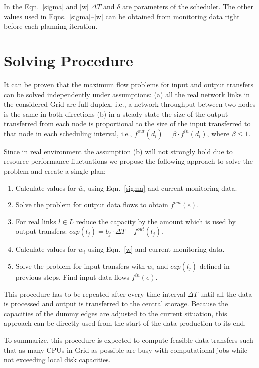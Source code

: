 \documentclass{svjour3}                     %
\begin{document}
%

In the Eqn.~\ref{sigma} and \ref{w} $\Delta T$ and $\delta$ are parameters of the scheduler. The other values used in
Eqns.~\ref{sigma}--\ref{w} can be obtained from monitoring data right before each planning iteration.

\section{Solving Procedure}
\label{solve}
It can be proven that the maximum flow problems for input and output transfers
can be solved independently under assumptions: (a) all the real network links
in the considered Grid are full-duplex, i.e., a network throughput between two
nodes is the same in both directions (b) in a steady state the size of the
output transferred from each node is proportional to the size of the input
transferred to that node in each scheduling interval, i.e.,
$f^{out}(\overline{d}_{i})= \beta \cdot f^{in}(d_{i})$, where $\beta \leq 1$.

Since in real environment the assumption (b) will not strongly hold due to
resource performance fluctuations we propose the following approach to
solve the problem and create a single plan:
%
\begin{enumerate}
\item Calculate values for $\overline{w}_{i}$ using Eqn.~\ref{sigma} and current monitoring data.
\item Solve the problem for output data flows to obtain $f^{out}(e)$.
\item For real links $l \in L$ reduce the capacity by the amount which is used by output transfers: $cap(l_{j}) = b_{j} \cdot \Delta T - f^{out}(l_{j})$.
\item Calculate values for $w_{i}$ using Eqn.~\ref{w} and current monitoring data.
\item Solve the problem for input transfers with $w_{i}$ and $cap(l_{j})$ defined in previous steps. Find input data flows $f^{in}(e)$.
\end{enumerate}
%
This procedure has to be repeated after every time interval $\Delta T$ until all the data is processed and output is transferred to the central storage. Because the capacities of the dummy edges are adjusted to the current situation, this approach can be directly used from the start of the data production to its end.

To summarize, this procedure is expected to compute feasible data transfers 
such that as many CPUs in Grid as possible are busy with computational jobs while not exceeding local disk capacities.
\end{document}
